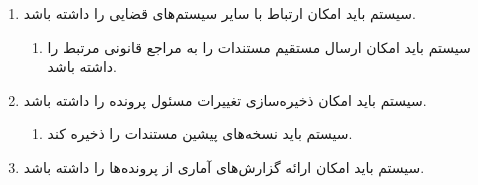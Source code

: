 \documentclass[12pt,a4paper,oneside]{article}
\begin{document}
\begin{itemize}
\begin{enumerate}
		\item 
        سیستم باید امکان ارتباط با سایر سیستم‌های قضایی را داشته باشد.
        \begin{enumerate}
            \renewcommand{\labelenumii}{\textbf{.R\arabic{enumi}.\arabic{enumii}}}
            \item 
            سیستم باید امکان ارسال مستقیم مستندات را به مراجع قانونی مرتبط را داشته باشد.
		\end{enumerate}	

		\item 
        سیستم باید امکان ذخیره‌سازی تغییرات مسئول پرونده را داشته باشد.
        \begin{enumerate}
            \renewcommand{\labelenumii}{\textbf{.R\arabic{enumi}.\arabic{enumii}}}
            \item 
            سیستم باید نسخه‌های پیشین مستندات را ذخیره کند.
        \end{enumerate}

        \item 
        سیستم باید امکان ارائه گزارش‌های آماری از پرونده‌ها را داشته باشد.

    \end{enumerate}
	
\end{itemize}
\end{document}
